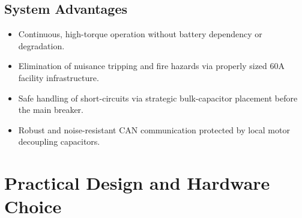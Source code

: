 \documentclass{article}
\begin{document}
\subsection{System Advantages}
\begin{itemize}
    \item Continuous, high-torque operation without battery dependency or degradation.
    \item Elimination of nuisance tripping and fire hazards via properly sized 60A facility infrastructure.
    \item Safe handling of short-circuits via strategic bulk-capacitor placement before the main breaker.
    \item Robust and noise-resistant CAN communication protected by local motor decoupling capacitors.
\end{itemize}

\section{Practical Design and Hardware Choice}
\end{document}
